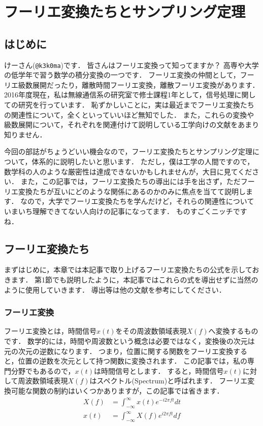 \chapter{フーリエ変換たちとサンプリング定理}

\section{はじめに}

けーさん(\verb|@k3k0ma|)です．
皆さんはフーリエ変換って知ってますか？
高専や大学の低学年で習う数学の積分変換の一つです．
フーリエ変換の仲間として，フーリエ級数展開だったり，離散時間フーリエ変換，離散フーリエ変換があります．
2016年度現在，私は無線通信系の研究室で修士課程1年として，信号処理に関しての研究を行っています．
恥ずかしいことに，実は最近までフーリエ変換たちの関連性について，全くといっていいほど無知でした．
また，これらの変換や級数展開について，それぞれを関連付けて説明している工学向けの文献をあまり知りません．

今回の部誌がちょうどいい機会なので，フーリエ変換たちとサンプリング定理について，体系的に説明したいと思います．
ただし，僕は工学の人間ですので，数学科の人のような厳密性は達成できないかもしれませんが，大目に見てください．
また，この記事では，フーリエ変換たちの導出には手を出さず，ただフーリエ変換たちが互いにどのような関係にあるのかのみに焦点を当てて説明します．
なので，大学でフーリエ変換たちを学んだけど，それらの関連性についていまいち理解できてない人向けの記事になってます．
ものすごくニッチですね．


\section{フーリエ変換たち}

まずはじめに，本章では本記事で取り上げるフーリエ変換たちの公式を示しておきます．
第1節でも説明したように，本記事ではこれらの式を導出せずに当然のように使用していきます．
導出等は他の文献を参考にしてください．


\subsection{フーリエ変換}

フーリエ変換とは，時間信号$x(t)$をその周波数領域表現$X(f)$へ変換するものです．
数学的には，時間や周波数という概念は必要ではなく，変換後の次元は元の次元の逆数になります．
つまり，位置に関する関数をフーリエ変換すると，位置の逆数を次元として持つ関数に変換されます．
この記事では，私の専門分野でもあるので，$x(t)$は時間信号とします．
すると，時間信号$x(t)$に対して周波数領域表現$X(f)$はスペクトル(Spectrum)と呼ばれます．
フーリエ変換可能な関数の制約はいくつかありますが，この記事では省きます．
\begin{align}
X(f) &= \int_{-\infty}^{\infty} x(t) e^{-i2\pi f t} dt \\
x(t) &= \int_{-\infty}^{\infty} X(f) e^{i2\pi ft} df
\end{align}

